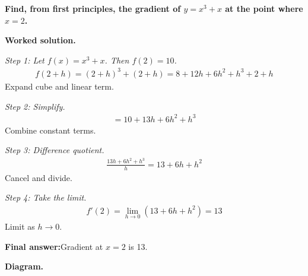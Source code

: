\documentclass[11pt]{article}
\newcommand{\question}[1]{\par\medskip\noindent\textbf{#1}\par}
\begin{document}
\question{Find, from first principles, the gradient of \( y = x^3 + x \) at the point where \( x = 2 \).}

\textbf{Worked solution.}

\textit{Step 1: Let \( f(x) = x^3 + x \). Then \( f(2) = 10 \).}
\[\begin{gathered}
f(2+h) = (2+h)^3 + (2+h) = 8 + 12h + 6h^2 + h^3 + 2 + h
\end{gathered}\]
Expand cube and linear term.

\textit{Step 2: Simplify.}
\[\begin{gathered}
= 10 + 13h + 6h^2 + h^3
\end{gathered}\]
Combine constant terms.

\textit{Step 3: Difference quotient.}
\[\begin{gathered}
\frac{13h + 6h^2 + h^3}{h} = 13 + 6h + h^2
\end{gathered}\]
Cancel and divide.

\textit{Step 4: Take the limit.}
\[\begin{gathered}
f'(2) = \lim_{h \to 0}(13 + 6h + h^2) = 13
\end{gathered}\]
Limit as \( h \to 0 \).

\begin{answerbox}
\textbf{Final answer:}\quad Gradient at \(\displaystyle  x = 2 \) is 13.
\end{answerbox}
\textbf{Diagram.}
\end{document}
